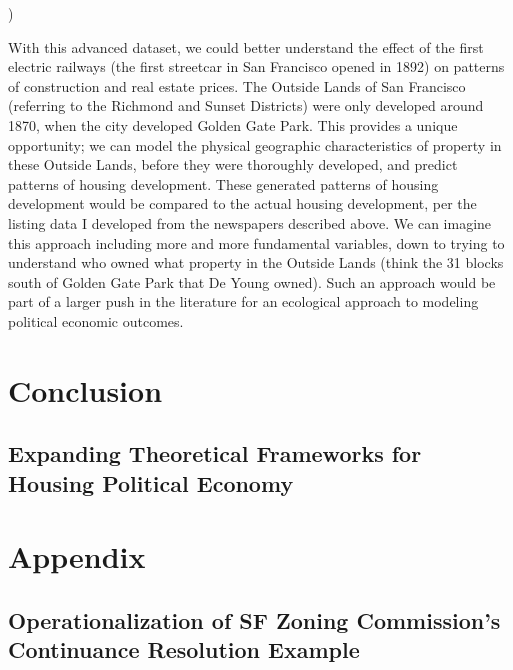 )\documentclass{article}[11pt]
\begin{document}
With this advanced dataset, we could better understand the effect of the first electric railways (the first streetcar in San Francisco opened in 1892) on patterns of construction and real estate prices. The Outside Lands of San Francisco (referring to the Richmond and Sunset Districts) were only developed around 1870, when the city developed Golden Gate Park. This provides a unique opportunity; we can model the physical geographic characteristics of property in these Outside Lands, before they were thoroughly developed, and predict patterns of housing development. These generated patterns of housing development would be compared to the actual housing development, per the listing data I developed from the newspapers described above. We can imagine this approach including more and more fundamental variables, down to trying to understand who owned what property in the Outside Lands (think the 31 blocks south of Golden Gate Park that De Young owned). Such an approach would be part of a larger push in the literature for an ecological approach to modeling political economic outcomes. \citep{haber2021ecological}

\section{Conclusion}

	\subsection{Expanding Theoretical Frameworks for Housing Political Economy}
	
\clearpage

\section{Appendix}

	\subsection{Operationalization of SF Zoning Commission's Continuance Resolution Example}
	
\end{document}
